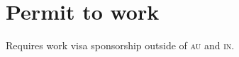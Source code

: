 \section*{Permit to work} %
\label{sec:ptw}

Requires work visa sponsorship outside of \textsc{au} and \textsc{in}.
